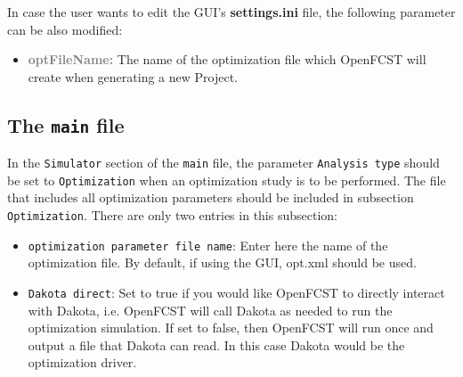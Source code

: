 In case the user wants to edit the GUI's \textbf{settings.ini} file, the following parameter can be also modified:

\begin{itemize}
 \item \textcolor{grey}{\textbf{optFileName:}} The name of the optimization file which OpenFCST will create when generating a new Project.
\end{itemize}


\subsection{The \texttt{main} file}
In the \texttt{Simulator} section of the \texttt{main} file, the parameter \texttt{Analysis type} should be set to \texttt{Optimization} when an optimization study is to be performed. The file that includes all optimization parameters should be included in subsection \texttt{Optimization}. There are only two entries in this subsection:
\begin{itemize}
 \item \texttt{optimization parameter file name}: Enter here the name of the optimization file. By default, if using the GUI, opt.xml should be used.
 \item \texttt{Dakota direct}: Set to true if you would like OpenFCST to directly interact with Dakota, i.e. OpenFCST will call Dakota as needed to run the optimization simulation. If set to false, then OpenFCST will run once and output a file that Dakota can read. In this case Dakota would be the optimization driver.
\end{itemize}


